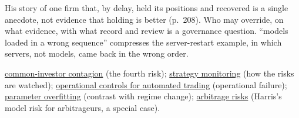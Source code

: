 \begin{qfdefinition}
His story of one firm that, by delay, held its positions and recovered is a single anecdote, not evidence that holding is better (p.~208). Who may override, on what evidence, with what record and review is a governance question. ``models loaded in a wrong sequence'' compresses the server-restart example, in which servers, not models, came back in the wrong order.

 \hyperref[def:common-investor-contagion]{common-investor contagion} (the fourth risk); \hyperref[meth:quant-strategy-monitoring]{strategy monitoring} (how the risks are watched); \hyperref[meth:automated-trading-operational-controls]{operational controls for automated trading} (operational failure); \hyperref[pit:parameter-overfitting]{parameter overfitting} (contrast with regime change); \hyperref[res:arbitrage-risks]{arbitrage risks} (Harris's model risk for arbitrageurs, a special case).

\end{qfdefinition}

